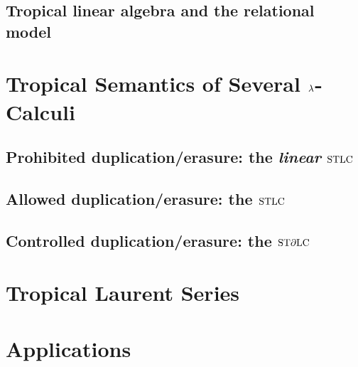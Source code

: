 \documentclass[conference]{IEEEtran}
\begin{document}
\subsection{Tropical linear algebra and the relational model%
}



\section{Tropical Semantics of Several $\lambda$-Calculi}\label{section3}
\subsection{Prohibited duplication/erasure: the \emph{linear} $\mathrm{STLC}$}


\subsection{Allowed duplication/erasure: the $\mathrm{STLC}$}


\subsection{Controlled duplication/erasure: the $\mathrm{ST}\partial\mathrm{LC}$}



\section{Tropical Laurent Series}\label{section4}



\section{Applications}\label{sec:app}\label{section5}


\end{document}
